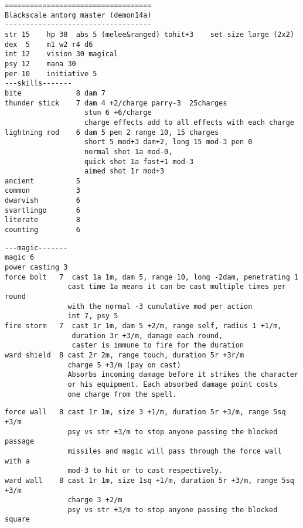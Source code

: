 \goodbreak \begin{samepage} \small \begin{verbatim}
===================================
Blackscale antorg master (demon14a)
-----------------------------------
str 15    hp 30  abs 5 (melee&ranged) tohit+3    set size large (2x2)
dex  5    m1 w2 r4 d6
int 12    vision 30 magical
psy 12    mana 30
per 10    initiative 5
---skills-------
bite             8 dam 7
thunder stick    7 dam 4 +2/charge parry-3  25charges
                   stun 6 +6/charge
                   charge effects add to all effects with each charge
lightning rod    6 dam 5 pen 2 range 10, 15 charges
                   short 5 mod+3 dam+2, long 15 mod-3 pen 0
                   normal shot 1a mod-0,
                   quick shot 1a fast+1 mod-3
                   aimed shot 1r mod+3
ancient          5
common           3
dwarvish         6
svartlingo       6
literate         8
counting         6
\end{verbatim} \end{samepage} \goodbreak \begin{samepage} \begin{verbatim}
---magic-------
magic 6
power casting 3
force bolt   7  cast 1a 1m, dam 5, range 10, long -2dam, penetrating 1
               cast time 1a means it can be cast multiple times per round
               with the normal -3 cumulative mod per action
               int 7, psy 5
fire storm   7  cast 1r 1m, dam 5 +2/m, range self, radius 1 +1/m,
                duration 3r +3/m, damage each round,
                caster is immune to fire for the duration
ward shield  8 cast 2r 2m, range touch, duration 5r +3r/m
               charge 5 +3/m (pay on cast)
               Absorbs incoming damage before it strikes the character
               or his equipment. Each absorbed damage point costs
               one charge from the spell.
\end{verbatim} \end{samepage} \goodbreak \begin{samepage} \begin{verbatim}
force wall   8 cast 1r 1m, size 3 +1/m, duration 5r +3/m, range 5sq +3/m
               psy vs str +3/m to stop anyone passing the blocked passage
               missiles and magic will pass through the force wall with a
               mod-3 to hit or to cast respectively.
ward wall    8 cast 1r 1m, size 1sq +1/m, duration 5r +3/m, range 5sq +3/m
               charge 3 +2/m
               psy vs str +3/m to stop anyone passing the blocked square

\end{verbatim}
\end{samepage}
